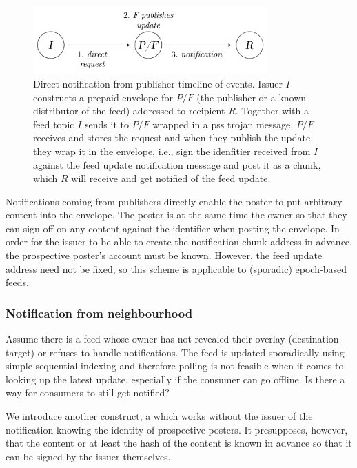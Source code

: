 \begin{figure}[htbp]
   \centering
    \includegraphics[width=0.8\textwidth]{fig/direct-notification-events.pdf}
   \caption[Direct notification from publisher timeline of events \statusgreen]{Direct notification from publisher timeline of events. Issuer $I$ constructs a prepaid envelope for $P/F$ (the publisher or a known distributor of the feed) addressed to recipient $R$. Together with a feed topic $I$ sends it to $P/F$ wrapped in a pss trojan message. $P/F$ receives and stores the request and when they publish the update, they wrap it in the envelope, i.e., sign the idenfitier received from $I$ against the feed update notification message and post it as a chunk, which $R$ will receive and get notified of the feed update. }
   \label{fig:direct-notification-events}
\end{figure}


Notifications coming from publishers directly enable the poster to put arbitrary content into the envelope. The poster is at the same time the owner so that they can sign off on any content against the identifier when posting the envelope. In order for the issuer to be able to create the notification chunk address in advance, the prospective poster's account must be known. However, the feed update address need not be fixed, so this scheme is applicable to (sporadic) epoch-based feeds.

\subsubsection{Notification from neighbourhood}

Assume there is a feed whose owner has not revealed their overlay (destination target) or refuses to handle notifications.  The feed is updated sporadically using simple sequential indexing and therefore polling is not feasible when it comes to looking up the latest update, especially if the consumer can go offline.
Is there a way for consumers to still get notified? 

We introduce another construct, a  which works without the issuer of the notification knowing the identity of prospective posters. It presupposes, however, that the content or at least the hash of the content is known in advance so that it can be signed by the issuer themselves.


